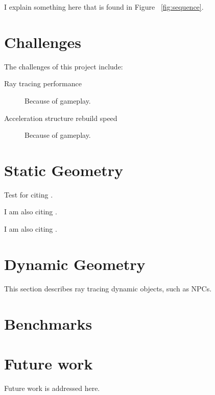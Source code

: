 \documentclass[]{article}
\begin{document}
I explain something here that is found in Figure ~\ref{fig:sequence}.

\section{Challenges}
The challenges of this project include:
\begin{description}
  \item [Ray tracing performance] Because of gameplay.
  \item [Acceleration structure rebuild speed] Because of gameplay.
\end{description}

\section{Static Geometry}
Test for citing \cite{amanatides1987fast}.

I am also citing \cite{ivson2009gpu}.

I am also citing \cite{reinhard2000dynamic}.

\section{Dynamic Geometry}
This section describes ray tracing dynamic objects, such as NPCs.

\section{Benchmarks}


\section{Future work}
Future work is addressed here.

{}


\listoffigures
\end{document}
